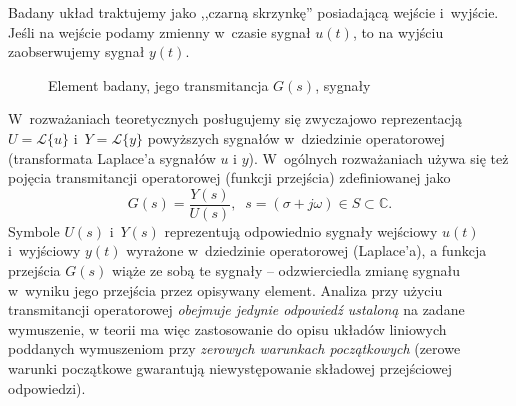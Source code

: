 \documentclass[paper=a4,DIV=12]{lpas}
\begin{document}
\begin{appendices}
  Badany układ traktujemy jako ,,czarną skrzynkę'' posiadającą wejście i~wyjście.
  Jeśli na wejście podamy zmienny w~czasie sygnał $u(t)$, to na wyjściu
  zaobserwujemy sygnał $y(t)$.
  \begin{figure}[htbp]
    \centering
    \caption{Element badany, jego transmitancja $G(s)$, sygnały}
    \label{fig:6TEOB}
  \end{figure}
  W~rozważaniach teoretycznych posługujemy się zwyczajowo reprezentacją
  $U = \mathscr{L}\{u\}$ i~$Y = \mathscr{L}\{y\}$ powyższych sygnałów
  w~dziedzinie operatorowej (transformata Laplace'a sygnałów $u$ i $y$).
  W~ogólnych rozważaniach używa się też pojęcia transmitancji operatorowej
  (funkcji przejścia) zdefiniowanej jako
  \begin{equation}
    G\left(s\right) = \frac{Y(s)}{U(s)}, \;\;
    s = \left( \sigma + j \omega \right) \in S \subset \mathbb{C}.
    \label{eq:34IJQ}
  \end{equation}
  Symbole $U\left(s\right)$ i~$Y\left(s\right)$ reprezentują odpowiednio sygnały
  wejściowy $u(t)$ i~wyjściowy $y(t)$ wyrażone w~dziedzinie
  operatorowej (Laplace'a), a funkcja przejścia $G(s)$ wiąże ze sobą te sygnały --
  odzwierciedla zmianę sygnału w~wyniku jego przejścia przez opisywany element.
  Analiza przy użyciu transmitancji operatorowej {\em obejmuje jedynie odpowiedź
  ustaloną} na zadane wymuszenie, w teorii ma więc zastosowanie do opisu układów
  liniowych poddanych wymuszeniom przy {\em zerowych warunkach początkowych}
  (zerowe warunki początkowe gwarantują niewystępowanie składowej przejściowej
  odpowiedzi).


\end{appendices}
\end{document}

